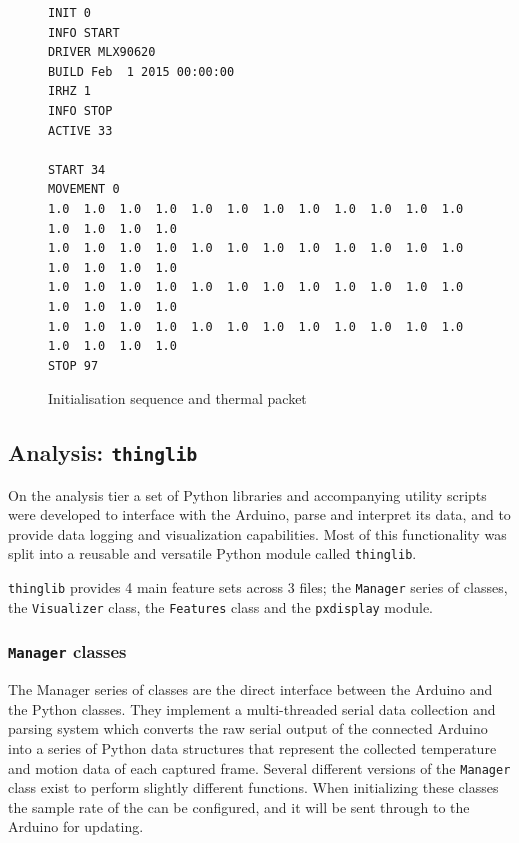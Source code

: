 \documentclass[../thesis/thesis.tex]{subfiles}
\begin{document}
\begin{figure}
 \centering
\begin{verbatim}
INIT 0
INFO START
DRIVER MLX90620
BUILD Feb  1 2015 00:00:00
IRHZ 1
INFO STOP
ACTIVE 33

START 34
MOVEMENT 0
1.0  1.0  1.0  1.0  1.0  1.0  1.0  1.0  1.0  1.0  1.0  1.0  1.0  1.0  1.0  1.0
1.0  1.0  1.0  1.0  1.0  1.0  1.0  1.0  1.0  1.0  1.0  1.0  1.0  1.0  1.0  1.0
1.0  1.0  1.0  1.0  1.0  1.0  1.0  1.0  1.0  1.0  1.0  1.0  1.0  1.0  1.0  1.0
1.0  1.0  1.0  1.0  1.0  1.0  1.0  1.0  1.0  1.0  1.0  1.0  1.0  1.0  1.0  1.0
STOP 97
\end{verbatim}
\caption{Initialisation sequence and thermal packet}
\label{fig:code:initseq}
\end{figure}

\subsection{Analysis: \texttt{thinglib}}

On the analysis tier a set of Python libraries and accompanying utility scripts were developed to interface with the Arduino, parse and interpret its data, and to provide data logging and visualization capabilities. Most of this functionality was split into a reusable and versatile Python module called \texttt{thinglib}.

\texttt{thinglib} provides 4 main feature sets across 3 files; the \texttt{Manager} series of classes, the \texttt{Visualizer} class, the \texttt{Features} class and the \texttt{pxdisplay} module.

\subsubsection{\texttt{Manager} classes}
The Manager series of classes are the direct interface between the Arduino and the Python classes. They implement a multi-threaded serial data collection and parsing system which converts the raw serial output of the connected Arduino into a series of Python data structures that represent the collected temperature and motion data of each captured frame. Several different versions of the \texttt{Manager} class exist to perform slightly different functions. When initializing these classes the sample rate of the \mlx can be configured, and it will be sent through to the Arduino for updating.
\end{document}
